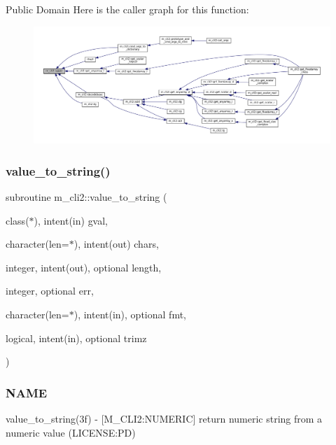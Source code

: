 Public Domain Here is the caller graph for this function\+:
\nopagebreak
\begin{figure}[H]
\begin{center}
\leavevmode
\includegraphics[width=350pt]{namespacem__cli2_afa7a2419002024ff6d950c5d905ddd7a_icgraph}
\end{center}
\end{figure}
\mbox{\label{namespacem__cli2_a1bbcefd886dabb0286e2cb14ab54034f}} 
\subsubsection{\texorpdfstring{value\+\_\+to\+\_\+string()}{value\_to\_string()}}
{\footnotesize\ttfamily subroutine m\+\_\+cli2\+::value\+\_\+to\+\_\+string (\begin{DoxyParamCaption}\item[{class($\ast$), intent(in)}]{gval,  }\item[{character(len=$\ast$), intent(out)}]{chars,  }\item[{integer, intent(out), optional}]{length,  }\item[{integer, optional}]{err,  }\item[{character(len=$\ast$), intent(in), optional}]{fmt,  }\item[{logical, intent(in), optional}]{trimz }\end{DoxyParamCaption})\hspace{0.3cm}{\ttfamily [private]}}



\subsubsection*{N\+A\+ME}

value\+\_\+to\+\_\+string(3f) -\/ \mbox{[}M\+\_\+\+C\+L\+I2\+:N\+U\+M\+E\+R\+IC\mbox{]} return numeric string from a numeric value (L\+I\+C\+E\+N\+SE\+:PD) 

